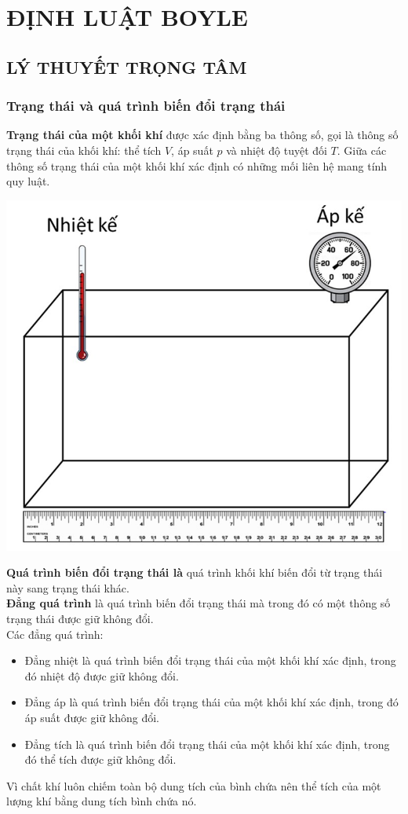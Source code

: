 \section{ĐỊNH LUẬT BOYLE}
\subsection{LÝ THUYẾT TRỌNG TÂM}
\begin{tomtat}
	\subsubsection{Trạng thái và quá trình biến đổi trạng thái}
	\begin{boxdn}
		\textbf{Trạng thái của một khối khí } được xác định bằng ba thông số, gọi là thông số trạng thái của khối khí: thể tích $V$, áp suất $p$ và nhiệt độ tuyệt đối $T$. Giữa các thông số trạng thái của một khối khí xác định có những mối liên hệ mang tính quy luật.
	\end{boxdn}
	\begin{center}
		\includegraphics[width=0.35\linewidth]{figs/VN12-Y24-PH-SYL-010-1}
	\end{center}
	\begin{dn}
		\textbf{Quá trình biến đổi trạng thái là} quá trình khối khí biến đổi từ trạng thái này sang trạng thái khác.\\
		\textbf{Đẳng quá trình} là quá trình biến đổi trạng thái mà trong đó có một thông số trạng thái được giữ không đổi.\\
		Các đẳng quá trình:
		\begin{itemize}
			\item Đẳng nhiệt là quá trình biến đổi trạng thái của một khối khí xác định, trong đó nhiệt độ được giữ không đổi.
			\item Đẳng áp là quá trình biến đổi trạng thái của một khối khí xác định, trong đó áp suất được giữ không đổi.
			\item Đẳng tích là quá trình biến đổi trạng thái của một khối khí xác định, trong đó thể tích được giữ không đổi.
		\end{itemize}
	\end{dn}
	\begin{luuy}
		Vì chất khí luôn chiếm toàn bộ dung tích của bình chứa nên thể tích của một lượng khí bằng dung tích bình chứa nó.
	\end{luuy}

\end{tomtat}
